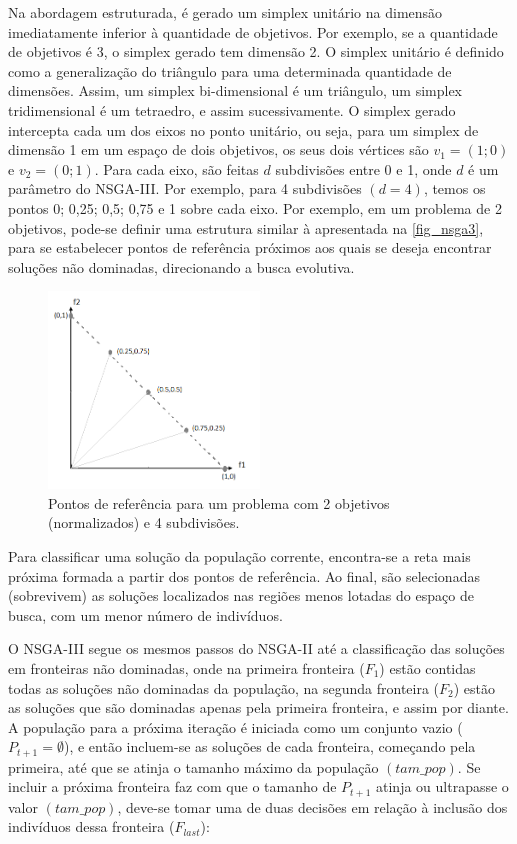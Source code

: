 Na abordagem estruturada, é gerado um simplex unitário na dimensão imediatamente inferior à quantidade de objetivos. Por exemplo, se a quantidade de objetivos é 3, o simplex gerado tem dimensão 2. O simplex unitário é definido como a generalização do triângulo para uma determinada quantidade de dimensões. Assim, um simplex bi-dimensional é um triângulo, um simplex tridimensional é um tetraedro, e assim sucessivamente. O simplex gerado intercepta cada um dos eixos no ponto unitário, ou seja, para um simplex de dimensão 1 em um espaço de dois objetivos, os seus dois vértices são $v_1 = (1;0)$ e $v_2 = (0;1)$. Para cada eixo, são feitas $d$ subdivisões entre 0 e 1, onde $d$ é um parâmetro do NSGA-III.  Por exemplo, para 4 subdivisões $(d = 4)$, temos os pontos 0; 0,25; 0,5; 0,75 e 1 sobre cada eixo. Por exemplo, em um problema de 2 objetivos, pode-se definir uma estrutura similar à apresentada na \autoref{fig_nsga3}, para se estabelecer pontos de referência próximos aos quais se deseja encontrar soluções não dominadas, direcionando a busca evolutiva.

\begin{figure}[!htbp]
	\centering
	\includegraphics[width=0.5\textwidth]{cap_otimizacao-multi/figs/nsga3}
	\caption{\label{fig_nsga3}Pontos de referência para um problema com 2 objetivos (normalizados) e 4 subdivisões.}
\end{figure}

Para classificar uma solução da população corrente, encontra-se a reta mais próxima formada a partir dos pontos de referência. Ao final, são selecionadas (sobrevivem) as soluções localizados nas regiões menos lotadas do espaço de busca, com um menor número de indivíduos.

O NSGA-III segue os mesmos passos do NSGA-II até a classificação das soluções em fronteiras não dominadas, onde na primeira fronteira ($F_1$) estão contidas todas as soluções não dominadas da população, na segunda fronteira ($F_2$) estão as soluções que são dominadas apenas pela primeira fronteira, e assim por diante. A população para a próxima iteração é iniciada como um conjunto vazio ($P_{t+1} = \emptyset$), e então incluem-se as soluções de cada fronteira, começando pela primeira, até que se atinja o tamanho máximo da população $(tam\_pop)$. Se incluir a próxima fronteira faz com que o tamanho de $P_{t+1}$ atinja ou ultrapasse o valor $(tam\_pop)$, deve-se tomar uma de duas decisões em relação à inclusão dos indivíduos dessa fronteira ($F_{last}$):

